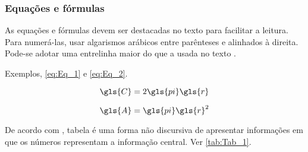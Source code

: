\subsubsection{Equações e fórmulas}

As equações e fórmulas devem ser destacadas no texto para facilitar a leitura.  Para numerá-las, usar algarismos arábicos entre parênteses e alinhados à direita. Pode-se adotar uma entrelinha maior do que a usada no texto \cite{NBR14724:2011}.

Exemplos, \autoref{eq:Eq_1} e \autoref{eq:Eq_2}.

\begin{equation}\label{eq:Eq_1}
\gls{C} = 2 \gls{pi} \gls{r}
\end{equation}

\begin{equation}\label{eq:Eq_2}
\gls{A} = \gls{pi} \gls{r}^2
\end{equation}


De acordo com \textcite{ibge1993}, tabela é uma forma não discursiva de apresentar informações em que os números representam a informação central. Ver \autoref{tab:Tab_1}.

